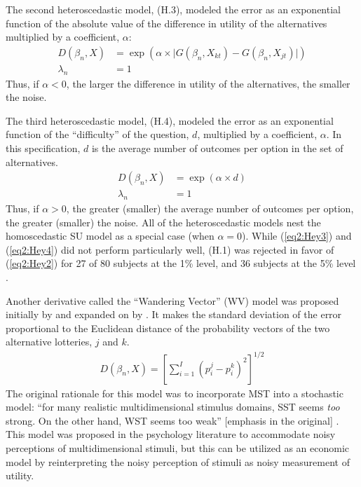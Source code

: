 \documentclass[../main.tex]{subfiles}
\begin{document}
The second heteroscedastic model, (H.3), modeled the error as an exponential function of the absolute value of the difference in utility of the alternatives multiplied by a coefficient, $\alpha$:
\begin{align*}
	\tag{H.3}
	\label{eq2:Hey3}
	D(\beta_n,X) &= \exp\left(\alpha \times \lvert G(\beta_n,X_{kt}) - G(\beta_n,X_{jt}) \rvert\right)\\
	\lambda_n &= 1
\end{align*}
Thus, if $\alpha < 0$, the larger the difference in utility of the alternatives, the smaller the noise.

The third heteroscedastic model, (H.4), modeled the error as an exponential function of the \enquote{difficulty} of the question, $d$, multiplied by a coefficient, $\alpha$.
In this specification, $d$ is the average number of outcomes per option in the set of alternatives.
\begin{align*}
	\tag{H.4}
	\label{eq2:Hey4}
	D(\beta_n,X) &= \exp(\alpha \times d)\\
	\lambda_n &= 1
\end{align*}
Thus, if $\alpha > 0$, the greater (smaller) the average number of outcomes per option, the greater (smaller) the noise.
All of the heteroscedastic models nest the homoscedastic SU model as a special case (when $\alpha=0$).
While (\ref{eq2:Hey3}) and (\ref{eq2:Hey4}) did not perform particularly well, (H.1) was rejected in favor of (\ref{eq2:Hey2}) for 27 of 80 subjects at the 1\% level, and 36 subjects at the 5\% level \parencite*[639]{Hey1995a}.

Another derivative called the \enquote{Wandering Vector} (WV) model was proposed initially by \textcite{Carroll1980} and expanded on by \textcite{Carroll1991}.
It makes the standard deviation of the error proportional to the Euclidean distance of the probability vectors of the two alternative lotteries, $j$ and $k$.
\begin{align*}
	D(\beta_n,X) = \left[  \sum_{i=1}^I (p_i^j - p_i^k)^2 \right]^{1/2}
\end{align*}
The original rationale for this model was to incorporate MST into a stochastic model: \enquote{for many realistic multidimensional stimulus domains, SST seems \textit{too} strong.
On the other hand, WST seems too weak} [emphasis in the original] \parencite*[343]{Carroll1991}.
This model was proposed in the psychology literature to accommodate noisy perceptions of multidimensional stimuli, but this can be utilized as an economic model by reinterpreting the noisy perception of stimuli as noisy measurement of utility.
\end{document}
